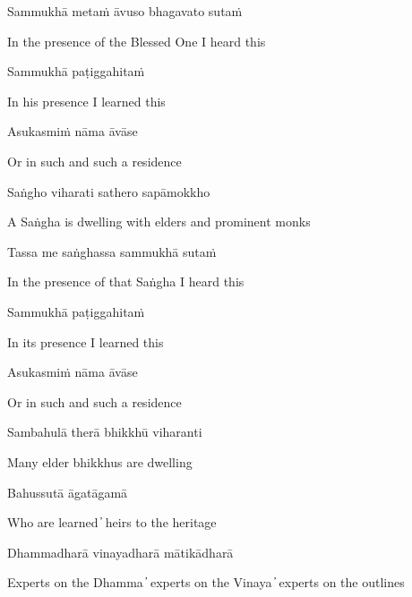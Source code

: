 Sammukhā metaṁ āvuso bhagavato sutaṁ

\begin{cprenglish}
In the presence of the Blessed One I heard this
\end{cprenglish}

Sammukhā paṭiggahitaṁ

\begin{cprenglish}
In his presence I learned this
\end{cprenglish}

Asukasmiṁ nāma āvāse

\begin{cprenglish}
Or in such and such a residence
\end{cprenglish}

Saṅgho viharati sathero sapāmokkho

\begin{cprenglish}
A Saṅgha is dwelling with elders and prominent monks
\end{cprenglish}

Tassa me saṅghassa sammukhā sutaṁ

\begin{cprenglish}
In the presence of that Saṅgha I heard this
\end{cprenglish}

Sammukhā paṭiggahitaṁ

\begin{cprenglish}
In its presence I learned this
\end{cprenglish}

Asukasmiṁ nāma āvāse

\begin{cprenglish}
Or in such and such a residence
\end{cprenglish}

Sambahulā therā bhikkhū viharanti

\begin{cprenglish}
Many elder bhikkhus are dwelling
\end{cprenglish}

Bahussutā āgatāgamā

\begin{cprenglish}
Who are learned  ̓  heirs to the heritage
\end{cprenglish}

Dhammadharā vinayadharā mātikādharā

\begin{cprenglish}
Experts on the Dhamma  ̓  experts on the Vinaya  ̓  experts on the outlines
\end{cprenglish}

